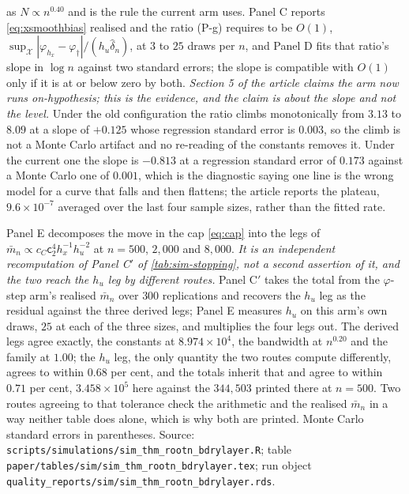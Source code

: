 \documentclass[
  12pt]{article}
\newcommand{\1}[1]{\mathds{1}\left[#1\right]}
\theoremstyle{plain}
\theoremstyle{definition}
\theoremstyle{definition}
\theoremstyle{remark}
\newcommand{\vdagger}{\varphi_{\dagger}}
\begin{document}
\begin{landscape}
as $N\propto n^{0.40}$ and is the rule the current arm uses. Panel C reports
\eqref{eq:xsmoothbias} realised and the ratio (P-g) requires to be $O(1)$,
$\sup_{\mathcal X}|\varphi_{h_x}-\vdagger|/(h_u\hat\delta_n)$, at $3$ to $25$
draws per $n$, and Panel D fits that ratio's slope in $\log n$ against two
standard errors; the slope is compatible with $O(1)$ only if it is at or below
zero by both. \emph{Section 5 of the article claims the arm now runs
on-hypothesis; this is the evidence, and the claim is about the slope and not
the level.} Under the old configuration the ratio climbs monotonically from
$3.13$ to $8.09$ at a slope of $+0.125$ whose regression standard error is
$0.003$, so the climb is not a Monte Carlo artifact and no re-reading of the
constants removes it. Under the current one the slope is $-0.813$ at a
regression standard error of $0.173$ against a Monte Carlo one of $0.001$, which
is the diagnostic saying one line is the wrong model for a curve that falls and
then flattens; the article reports the plateau, $9.6\times10^{-7}$ averaged over
the last four sample sizes, rather than the fitted rate.

Panel E decomposes the move in the cap \eqref{eq:cap} into the legs of
$\bar m_n\propto c_C\mathsf c_2^{4}h_x^{-1}h_u^{-2}$ at $n=500$, $2{,}000$
and $8{,}000$. \emph{It is an independent recomputation of Panel C$'$ of
\cref{tab:sim-stopping}, not a second assertion of it, and the two reach the $h_u$ leg
by different routes.} Panel C$'$ takes the total from the $\varphi$-step arm's
realised $\bar m_n$ over $300$ replications and recovers the $h_u$ leg as the
residual against the three derived legs; Panel E measures $h_u$ on this arm's
own draws, $25$ at each of the three sizes, and multiplies the four legs out.
The derived legs agree exactly, the constants at $8.974\times10^{4}$, the
bandwidth at $n^{0.20}$ and the family at $1.00$; the $h_u$ leg, the only
quantity the two routes compute differently, agrees to within $0.68$ per cent,
and the totals inherit that and agree to within $0.71$ per cent,
$3.458\times10^{5}$ here against the $344{,}503$ printed there at $n=500$. Two
routes agreeing to that tolerance check the arithmetic and the realised
$\bar m_n$ in a way neither table does alone, which is why both are printed.
Monte Carlo standard errors in parentheses. Source:
\texttt{scripts/simulations/sim\_thm\_rootn\_bdrylayer.R}; table
\texttt{paper/tables/sim/sim\_thm\_rootn\_bdrylayer.tex}; run object
\texttt{quality\_reports/sim/sim\_thm\_rootn\_bdrylayer.rds}.
\par\endgroup
\end{landscape}
\end{document}
